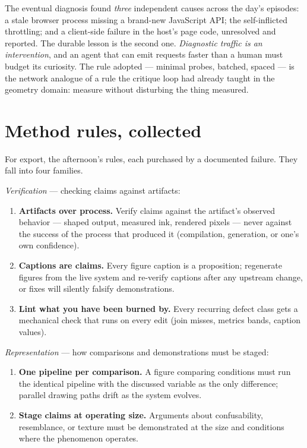 \documentclass[11pt]{article}
\begin{document}
The eventual diagnosis found \emph{three} independent causes across the day's episodes: a stale browser process missing a brand-new JavaScript API; the self-inflicted throttling; and a client-side failure in the host's page code, unresolved and reported. The durable lesson is the second one. \emph{Diagnostic traffic is an intervention}, and an agent that can emit requests faster than a human must budget its curiosity. The rule adopted — minimal probes, batched, spaced — is the network analogue of a rule the critique loop had already taught in the geometry domain: measure without disturbing the thing measured.

\section{Method rules, collected}\label{sec:rules}

For export, the afternoon's rules, each purchased by a documented failure. They fall into four families.

\emph{Verification} — checking claims against artifacts:
\begin{enumerate}\itemsep2pt
\item \textbf{Artifacts over process.} Verify claims against the artifact's observed behavior — shaped output, measured ink, rendered pixels — never against the success of the process that produced it (compilation, generation, or one's own confidence).
\item \textbf{Captions are claims.} Every figure caption is a proposition; regenerate figures from the live system and re-verify captions after any upstream change, or fixes will silently falsify demonstrations.
\item \textbf{Lint what you have been burned by.} Every recurring defect class gets a mechanical check that runs on every edit (join misses, metrics bands, caption values).
\end{enumerate}

\emph{Representation} — how comparisons and demonstrations must be staged:
\begin{enumerate}\itemsep2pt\setcounter{enumi}{3}
\item \textbf{One pipeline per comparison.} A figure comparing conditions must run the identical pipeline with the discussed variable as the only difference; parallel drawing paths drift as the system evolves.
\item \textbf{Stage claims at operating size.} Arguments about confusability, resemblance, or texture must be demonstrated at the size and conditions where the phenomenon operates.
\end{enumerate}
\end{document}
